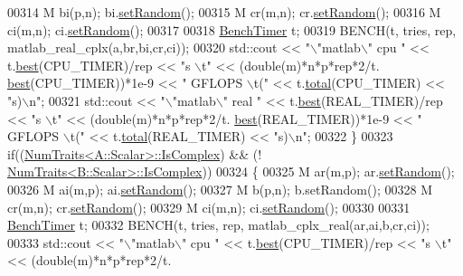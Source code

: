 \begin{DoxyCode}
{00314     M bi(p,n); bi.\hyperlink{class_eigen_1_1_plain_object_base_af0e576a0e1aefc9ee346de44cc352ba3}{setRandom}();
00315     M cr(m,n); cr.\hyperlink{class_eigen_1_1_plain_object_base_af0e576a0e1aefc9ee346de44cc352ba3}{setRandom}();
00316     M ci(m,n); ci.\hyperlink{class_eigen_1_1_plain_object_base_af0e576a0e1aefc9ee346de44cc352ba3}{setRandom}();
00317     
00318     \hyperlink{class_eigen_1_1_bench_timer}{BenchTimer} t;
00319     BENCH(t, tries, rep, matlab\_real\_cplx(a,br,bi,cr,ci));
00320     std::cout << \textcolor{stringliteral}{"\(\backslash\)"matlab\(\backslash\)" cpu    "} << t.\hyperlink{class_eigen_1_1_bench_timer_ae8b673b0fa356d3432c7a65c79e8af0e}{best}(CPU\_TIMER)/rep  << \textcolor{stringliteral}{"s  \(\backslash\)t"} << (double(m)*n*p*rep*2/t.
      \hyperlink{class_eigen_1_1_bench_timer_ae8b673b0fa356d3432c7a65c79e8af0e}{best}(CPU\_TIMER))*1e-9  <<  \textcolor{stringliteral}{" GFLOPS \(\backslash\)t("} << t.\hyperlink{class_eigen_1_1_bench_timer_af341aa613dba2d4a3d167093197e4e7a}{total}(CPU\_TIMER)  << \textcolor{stringliteral}{"s)\(\backslash\)n"};
00321     std::cout << \textcolor{stringliteral}{"\(\backslash\)"matlab\(\backslash\)" real   "} << t.\hyperlink{class_eigen_1_1_bench_timer_ae8b673b0fa356d3432c7a65c79e8af0e}{best}(REAL\_TIMER)/rep << \textcolor{stringliteral}{"s  \(\backslash\)t"} << (double(m)*n*p*rep*2/t.
      \hyperlink{class_eigen_1_1_bench_timer_ae8b673b0fa356d3432c7a65c79e8af0e}{best}(REAL\_TIMER))*1e-9 <<  \textcolor{stringliteral}{" GFLOPS \(\backslash\)t("} << t.\hyperlink{class_eigen_1_1_bench_timer_af341aa613dba2d4a3d167093197e4e7a}{total}(REAL\_TIMER) << \textcolor{stringliteral}{"s)\(\backslash\)n"};
00322   \}
00323   \textcolor{keywordflow}{if}((\hyperlink{group___core___module_struct_eigen_1_1_num_traits}{NumTraits<A::Scalar>::IsComplex}) && (!
      \hyperlink{group___core___module_struct_eigen_1_1_num_traits}{NumTraits<B::Scalar>::IsComplex}))
00324   \{
00325     M ar(m,p); ar.\hyperlink{class_eigen_1_1_plain_object_base_af0e576a0e1aefc9ee346de44cc352ba3}{setRandom}();
00326     M ai(m,p); ai.\hyperlink{class_eigen_1_1_plain_object_base_af0e576a0e1aefc9ee346de44cc352ba3}{setRandom}();
00327     M b(p,n);  b.setRandom();
00328     M cr(m,n); cr.\hyperlink{class_eigen_1_1_plain_object_base_af0e576a0e1aefc9ee346de44cc352ba3}{setRandom}();
00329     M ci(m,n); ci.\hyperlink{class_eigen_1_1_plain_object_base_af0e576a0e1aefc9ee346de44cc352ba3}{setRandom}();
00330     
00331     \hyperlink{class_eigen_1_1_bench_timer}{BenchTimer} t;
00332     BENCH(t, tries, rep, matlab\_cplx\_real(ar,ai,b,cr,ci));
00333     std::cout << \textcolor{stringliteral}{"\(\backslash\)"matlab\(\backslash\)" cpu    "} << t.\hyperlink{class_eigen_1_1_bench_timer_ae8b673b0fa356d3432c7a65c79e8af0e}{best}(CPU\_TIMER)/rep  << \textcolor{stringliteral}{"s  \(\backslash\)t"} << (double(m)*n*p*rep*2/t.
}
\end{DoxyCode}
